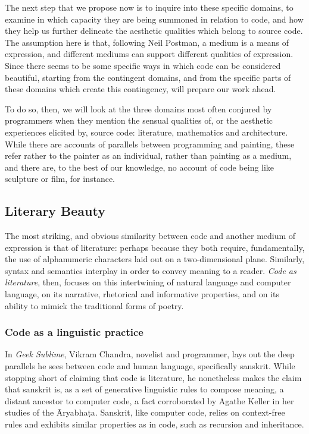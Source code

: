The next step that we propose now is to inquire into these specific domains, to examine in which capacity they are being summoned in relation to code, and how they help us further delineate the aesthetic qualities which belong to source code. The assumption here is that, following Neil Postman, a medium is a means of expression, and different mediums can support different qualities of expression\cite{postman_amusing_1985}. Since there seems to be some specific ways in which code can be considered beautiful, starting from the contingent domains, and from the specific parts of these domains which create this contingency, will prepare our work ahead.

To do so, then, we will look at the three domains most often conjured by programmers when they mention the sensual qualities of, or the aesthetic experiences elicited by, source code: literature, mathematics and architecture. While there are accounts of parallels between programming and painting\cite{graham_hackers_2003}, these refer rather to the painter as an individual, rather than painting as a medium, and there are, to the best of our knowledge, no account of code being like sculpture or film, for instance.

\subsection{Literary Beauty}

The most striking, and obvious similarity between code and another medium of expression is that of literature: perhaps because they both require, fundamentally, the use of alphanumeric characters laid out on a two-dimensional plane. Similarly, syntax and semantics interplay in order to convey meaning to a reader. \emph{Code as literature}, then, focuses on this intertwining of natural language and computer language, on its narrative, rhetorical and informative properties, and on its ability to mimick the traditional forms of poetry.

\subsubsection{Code as a linguistic practice}

In \emph{Geek Sublime}, Vikram Chandra, novelist and programmer, lays out the deep parallels he sees between code and human language, specifically sanskrit. While stopping short of claiming that code is literature, he nonetheless makes the claim that sanskrit is, as a set of generative linguistic rules to compose meaning, a distant ancestor to computer code\cite{chandra_geek_2014}, a fact corroborated by Agathe Keller in her studies of the Āryabhaṭa\cite{keller_textes_2021}. Sanskrit, like computer code, relies on context-free rules and exhibits similar properties as in code, such as recursion and inheritance.

